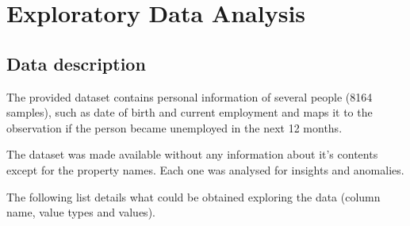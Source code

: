 \section{Exploratory Data Analysis}
\label{sec:eda}

\subsection{Data description}
\label{subsec:description}

The provided dataset contains personal information of several people
(8164 samples), such as date of birth and current employment and maps
it to the observation if the person became unemployed in the next 12 months.

The dataset was made available without any information about it's contents
except for the property names.
Each one was analysed for insights and anomalies.

The following list details what could be obtained exploring the data
(column name, value types and values).

